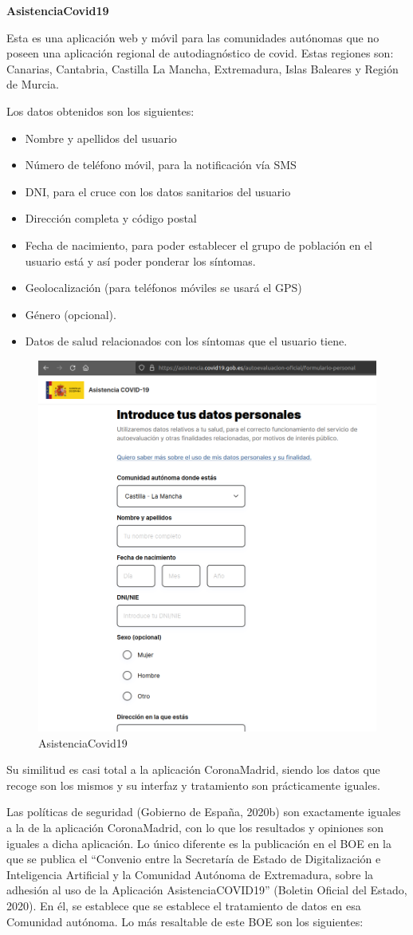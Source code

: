 \documentclass[11pt,a4paper,spanish]{article}
\begin{document}
\textbf{AsistenciaCovid19}

Esta es una aplicación web y móvil para las comunidades autónomas que no poseen una aplicación regional de autodiagnóstico de covid. Estas regiones son: Canarias, Cantabria, Castilla La Mancha, Extremadura, Islas Baleares y Región de Murcia.

Los datos obtenidos son los siguientes:

\begin{itemize}
\item Nombre y apellidos del usuario
\item Número de teléfono móvil, para la notificación vía SMS
\item DNI, para el cruce con los datos sanitarios del usuario
\item Dirección completa y código postal
\item Fecha de nacimiento, para poder establecer el grupo de población en el usuario está y así poder ponderar los síntomas.
\item Geolocalización (para teléfonos móviles se usará el GPS)
\item Género (opcional).
\item Datos de salud relacionados con los síntomas que el usuario tiene.
\end{itemize} 
\newpage
\begin{figure}[h!]
  \centering
  \includegraphics[width=0.55\linewidth]{4.png} 
  \caption{AsistenciaCovid19}
\end{figure}

Su similitud es casi total a la aplicación CoronaMadrid, siendo los datos que recoge son los mismos y su interfaz y tratamiento son prácticamente iguales.

Las políticas de seguridad (Gobierno de España, 2020b) son exactamente iguales a la de la aplicación CoronaMadrid, con lo que los resultados y opiniones son iguales a dicha aplicación. Lo único diferente es la publicación en el BOE en la que se publica el “Convenio entre la Secretaría de Estado de Digitalización e Inteligencia Artificial y la Comunidad Autónoma de Extremadura, sobre la adhesión al uso de la Aplicación AsistenciaCOVID19” (Boletin Oficial del Estado, 2020). En él, se establece que se establece el tratamiento de datos en esa Comunidad autónoma. Lo más resaltable de este BOE son los siguientes:
\end{document}
